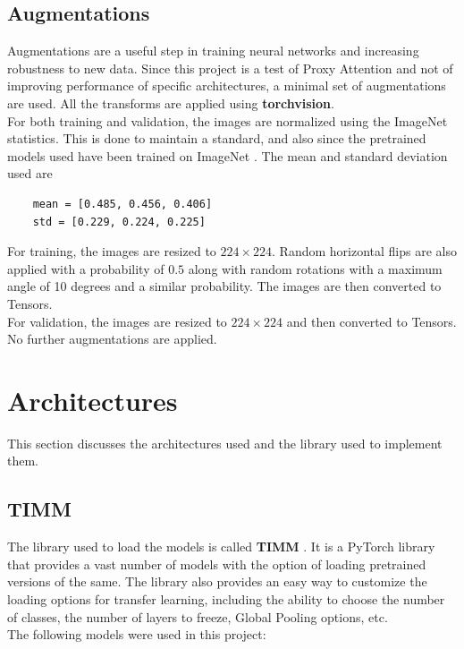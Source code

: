 \subsection{Augmentations}
Augmentations are a useful step in training neural networks and increasing robustness to new data. Since this project is a test of Proxy Attention and not of improving performance of specific architectures, a minimal set of augmentations are used. All the transforms are applied using \textbf{torchvision}.\\
For both training and validation, the images are normalized using the ImageNet statistics. This is done to maintain a standard, and also since the pretrained models used have been trained on ImageNet \cite{dengImageNetLargeScaleHierarchical2009}. The mean and standard deviation used are \begin{verbatim}
    mean = [0.485, 0.456, 0.406]
    std = [0.229, 0.224, 0.225]
\end{verbatim}
For training, the images are resized to $224\times224$. Random horizontal flips are also applied with a probability of $0.5$ along with random rotations with a maximum angle of 10 degrees and a similar probability. The images are then converted to Tensors.\\
For validation, the images are resized to $224\times224$ and then converted to Tensors. No further augmentations are applied.\\

\section{Architectures}
This section discusses the architectures used and the library used to implement them.

\subsection{TIMM}
The library used to load the models is called \textbf{TIMM} \cite{wightmanRwightmanPytorchimagemodelsV02023}. It is a PyTorch library that provides a vast number of models with the option of loading pretrained versions of the same. The library also provides an easy way to customize the loading options for transfer learning, including the ability to choose the number of classes, the number of layers to freeze, Global Pooling options, etc.\\
The following models were used in this project:

